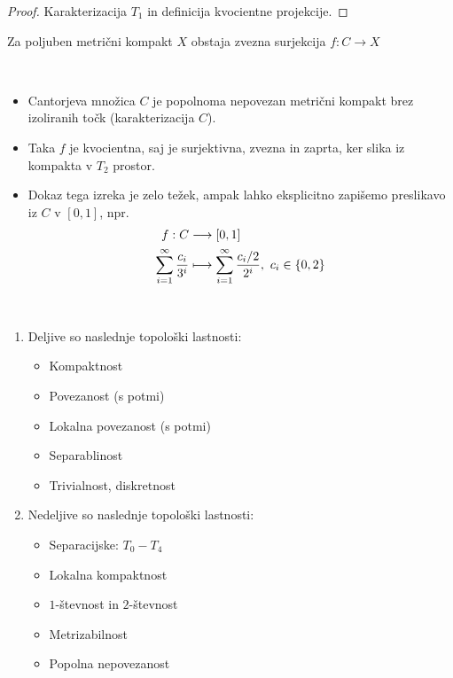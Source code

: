 \begin{proof}
    Karakterizacija \(T_1\) in definicija kvocientne projekcije.
\end{proof}

\begin{izrek}[Aleksandrov]
    Za poljuben metrični kompakt \(X\) obstaja zvezna surjekcija \(f: C \to X\)
\end{izrek}

\begin{opomba} \
    \begin{itemize}
        \item Cantorjeva množica \(C\) je popolnoma nepovezan metrični kompakt brez izoliranih točk (karakterizacija \(C\)).
        \item Taka \(f\) je kvocientna, saj je surjektivna, zvezna in zaprta, ker slika iz kompakta v \(T_2\) prostor.
        \item Dokaz tega izreka je zelo težek, ampak lahko eksplicitno zapišemo preslikavo iz \(C\) v \([0,1]\), npr. 
        \begin{align*}
            f: C &\longrightarrow  [0,1] \\
            \sum_{i=1}^{\infty} \frac{c_i}{3^i} &\longmapsto \sum_{i=1}^{\infty} \frac{c_i / 2}{2^i}, \ c_i \in \left\{0, 2\right\}
        \end{align*}
    \end{itemize}
\end{opomba}

\begin{trditev} \ 
    \begin{enumerate}
        \item Deljive so naslednje topološki lastnosti:
        \begin{itemize}
            \item Kompaktnost
            \item Povezanost (s potmi)
            \item Lokalna povezanost (s potmi)
            \item Separablinost
            \item Trivialnost, diskretnost
        \end{itemize}
        \item Nedeljive so naslednje topološki lastnosti:
        \begin{itemize}
            \item Separacijske: \(T_0 - T_4\)
            \item Lokalna kompaktnost
            \item \(1\)-števnost in \(2\)-števnost
            \item Metrizabilnost
            \item Popolna nepovezanost
        \end{itemize}
    \end{enumerate}
\end{trditev}

